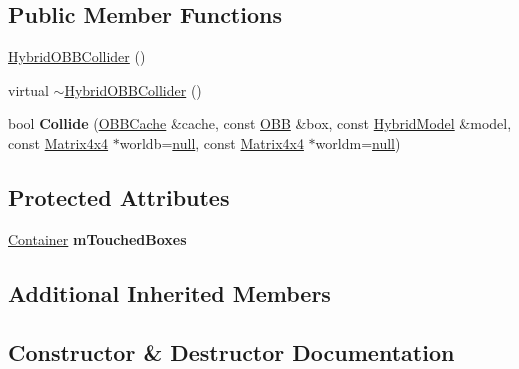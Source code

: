 \subsection*{Public Member Functions}
\begin{DoxyCompactItemize}
\item 
\hyperlink{classOpcode_1_1HybridOBBCollider_a2b99e0c6c8d022f3b6479455c8856976}{Hybrid\+O\+B\+B\+Collider} ()
\item 
virtual \hyperlink{classOpcode_1_1HybridOBBCollider_a5e586273fcac97be30a049b45b584b53}{$\sim$\+Hybrid\+O\+B\+B\+Collider} ()
\item 
bool {\bfseries Collide} (\hyperlink{structOpcode_1_1OBBCache}{O\+B\+B\+Cache} \&cache, const \hyperlink{classOpcode_1_1OBB}{O\+BB} \&box, const \hyperlink{classOpcode_1_1HybridModel}{Hybrid\+Model} \&model, const \hyperlink{classOpcode_1_1Matrix4x4}{Matrix4x4} $\ast$worldb=\hyperlink{IceTypes_8h_ac97b8ee753e4405397a42ad5799b0f9e}{null}, const \hyperlink{classOpcode_1_1Matrix4x4}{Matrix4x4} $\ast$worldm=\hyperlink{IceTypes_8h_ac97b8ee753e4405397a42ad5799b0f9e}{null})\hypertarget{classOpcode_1_1HybridOBBCollider_a4f5c790cc308ace8db5c8d27f5c5805a}{}\label{classOpcode_1_1HybridOBBCollider_a4f5c790cc308ace8db5c8d27f5c5805a}

\end{DoxyCompactItemize}
\subsection*{Protected Attributes}
\begin{DoxyCompactItemize}
\item 
\hyperlink{classContainer}{Container} {\bfseries m\+Touched\+Boxes}\hypertarget{classOpcode_1_1HybridOBBCollider_a4f3ab5de8afc854053f6f03560119dc8}{}\label{classOpcode_1_1HybridOBBCollider_a4f3ab5de8afc854053f6f03560119dc8}

\end{DoxyCompactItemize}
\subsection*{Additional Inherited Members}


\subsection{Constructor \& Destructor Documentation}
